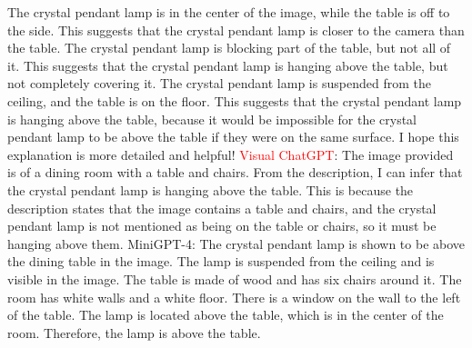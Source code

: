 \begin{enumerate}
    The crystal pendant lamp is in the center of the image, while the table is off to the side. This suggests that the crystal pendant lamp is closer to the camera than the table.
    The crystal pendant lamp is blocking part of the table, but not all of it. This suggests that the crystal pendant lamp is hanging above the table, but not completely covering it.
    The crystal pendant lamp is suspended from the ceiling, and the table is on the floor. This suggests that the crystal pendant lamp is hanging above the table, because it would be impossible for the crystal pendant lamp to be above the table if they were on the same surface.
    I hope this explanation is more detailed and helpful!
    \subitem \textcolor{red}{Visual ChatGPT}: The image provided is of a dining room with a table and chairs. From the description, I can infer that the crystal pendant lamp is hanging above the table. This is because the description states that the image contains a table and chairs, and the crystal pendant lamp is not mentioned as being on the table or chairs, so it must be hanging above them.
    \subitem MiniGPT-4: The crystal pendant lamp is shown to be above the dining table in the image. The lamp is suspended from the ceiling and is visible in the image. The table is made of wood and has six chairs around it. The room has white walls and a white floor. There is a window on the wall to the left of the table. The lamp is located above the table, which is in the center of the room. Therefore, the lamp is above the table.
\end{enumerate}
